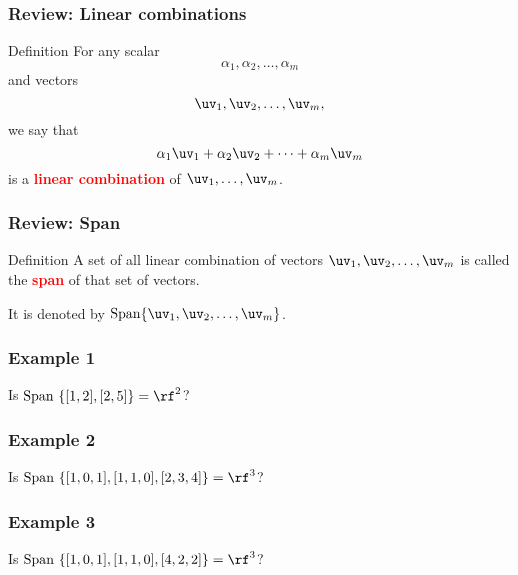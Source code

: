 

\begin{frame}
  \frametitle{Review: Linear combinations}

  \begin{block}{Definition}
    For any scalar \
    \[
    \alpha_1,\alpha_2,\ldots,\alpha_m
    \]
    and vectors
    \[
    \uv_1,\uv_2,\ldots,\uv_m,
    \]
    we say that
    \[
    \alpha_1\uv_1 + \alpha_2\uv_2 + \cdots + \alpha_m \uv_m
    \]
    is a \textcolor{red}{\bf linear combination} of $\uv_1,\ldots,\uv_m$.
  \end{block}
\end{frame}

\begin{frame}
  \frametitle{Review: Span}

  \begin{block}{Definition}
    A set of all linear combination of vectors $\uv_1,\uv_2,\ldots,\uv_m$ is called the \textcolor{red}{\bf span} of that set of vectors.

    It is denoted by $\mathrm{Span} \{\uv_1,\uv_2,\ldots,\uv_m\}$.
  \end{block}
\end{frame}

\begin{frame}
  \frametitle{Example 1}
  Is $\mathrm{Span}\ \{[1,2],[2,5]\} = \rf^2$?
  \vspace{2.5in}
\end{frame}

\begin{frame}
  \frametitle{Example 2}
  Is $\mathrm{Span}\ \{[1,0,1],[1,1,0],[2,3,4]\} = \rf^3$?
  \vspace{2.5in}
\end{frame}

\begin{frame}
  \frametitle{Example 3}
  Is $\mathrm{Span}\ \{[1,0,1],[1,1,0],[4,2,2]\} = \rf^3$?
  \vspace{2.5in}
\end{frame}

